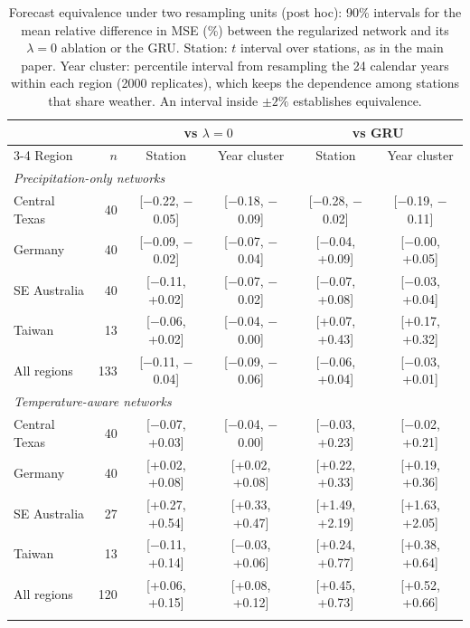 \begin{table}[tbp]
\caption{Forecast equivalence under two resampling units (post hoc): 90\% intervals for the mean relative
difference in MSE (\%) between the regularized network and its $\lambda=0$ ablation or the GRU. Station:
$t$ interval over stations, as in the main paper. Year cluster: percentile interval from resampling the 24
calendar years within each region (2000 replicates), which keeps the dependence among stations that share
weather. An interval inside $\pm2\%$ establishes equivalence.}
\label{tab:forecastcluster}
\footnotesize\setlength{\tabcolsep}{3pt}
\begin{tabular*}{\textwidth}{@{\extracolsep\fill}lrcccc}
\toprule
& & \multicolumn{2}{c}{vs $\lambda=0$} & \multicolumn{2}{c}{vs GRU}\\
\cmidrule{3-4}\cmidrule{5-6}
Region & $n$ & Station & Year cluster & Station & Year cluster\\
\midrule
\multicolumn{6}{l}{\textit{Precipitation-only networks}}\\
\quad Central Texas & 40 & [$-$0.22, $-$0.05] & [$-$0.18, $-$0.09] & [$-$0.28, $-$0.02] & [$-$0.19, $-$0.11] \\
\quad Germany & 40 & [$-$0.09, $-$0.02] & [$-$0.07, $-$0.04] & [$-$0.04, +0.09] & [$-$0.00, +0.05] \\
\quad SE Australia & 40 & [$-$0.11, +0.02] & [$-$0.07, $-$0.02] & [$-$0.07, +0.08] & [$-$0.03, +0.04] \\
\quad Taiwan & 13 & [$-$0.06, +0.02] & [$-$0.04, $-$0.00] & [+0.07, +0.43] & [+0.17, +0.32] \\
\quad All regions & 133 & [$-$0.11, $-$0.04] & [$-$0.09, $-$0.06] & [$-$0.06, +0.04] & [$-$0.03, +0.01] \\
\midrule
\multicolumn{6}{l}{\textit{Temperature-aware networks}}\\
\quad Central Texas & 40 & [$-$0.07, +0.03] & [$-$0.04, $-$0.00] & [$-$0.03, +0.23] & [$-$0.02, +0.21] \\
\quad Germany & 40 & [+0.02, +0.08] & [+0.02, +0.08] & [+0.22, +0.33] & [+0.19, +0.36] \\
\quad SE Australia & 27 & [+0.27, +0.54] & [+0.33, +0.47] & [+1.49, +2.19] & [+1.63, +2.05] \\
\quad Taiwan & 13 & [$-$0.11, +0.14] & [$-$0.03, +0.06] & [+0.24, +0.77] & [+0.38, +0.64] \\
\quad All regions & 120 & [+0.06, +0.15] & [+0.08, +0.12] & [+0.45, +0.73] & [+0.52, +0.66] \\
\botrule
\end{tabular*}
\end{table}
